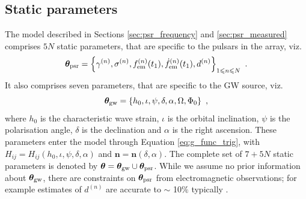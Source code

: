 \documentclass[fleqn,usenatbib,useAMS]{mnras}
\begin{document}
\subsection{Static parameters}\label{sec:ss_params}
The model described in Sections \ref{sec:psr_frequency} and \ref{sec:psr_measured} comprises $5N$ static parameters, that are specific to the pulsars in the array, viz.
\begin{equation}
	\boldsymbol{\theta}_{\rm psr} = \left \{ \gamma^{(n)},\sigma^{(n)}, f_{\rm em}^{(n)}(t_1),\dot{f}_{\rm em}^{(n)}(t_1),d^{(n)}\right\}_{1\leq n \leq N} \ .  \label{eq:psrparams}
\end{equation}
It also comprises seven parameters, that are specific to the GW source, viz. 
\begin{equation}
	\boldsymbol{\theta}_{\rm gw} = \left \{ h_0, \iota, \psi, \delta, \alpha, \Omega, \Phi_0 \right \} \ ,  \label{eq:params3}
\end{equation}
where $h_0$ is the characteristic wave strain, $\iota$ is the orbital inclination, $\psi$ is the polarisation angle, $\delta$ is the declination and $\alpha$ is the right ascension. These parameters enter the model through Equation \eqref{eq:g_func_trig}, with $H_{ij} = H_{ij}(h_0, \iota, \psi, \delta, \alpha)$ and $\boldsymbol{n}=\boldsymbol{n}(\delta,\alpha)$. The complete set of $7 + 5N$ static parameters is denoted by $\boldsymbol{\theta} = \boldsymbol{\theta}_{\rm gw} \cup \boldsymbol{\theta}_{\rm psr}$. While we assume no prior information about $\boldsymbol{\theta}_{\rm gw}$, there are constraints on $\boldsymbol{\theta}_{\rm psr}$ from electromagnetic observations; for example estimates of $d^{(n)}$ are accurate to $\sim$ 10$\%$ typically \citep{Cordes2002astro.ph..7156C, Verbiest2012ApJ...755...39V, Desvignes2016,Yao2017}.
\end{document}
